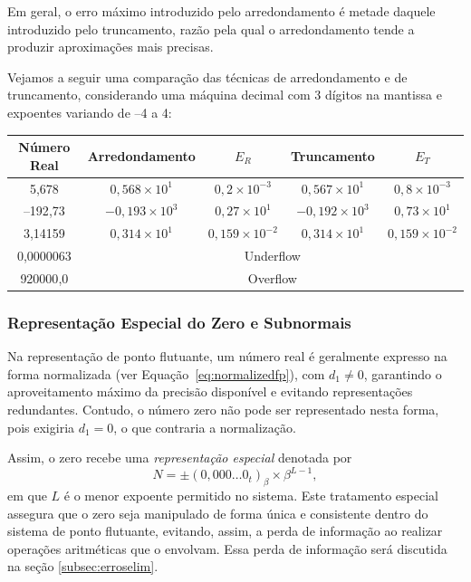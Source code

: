 Em geral, o erro máximo introduzido pelo arredondamento é metade daquele
introduzido pelo truncamento, razão pela qual o arredondamento tende a produzir
aproximações mais precisas.

Vejamos a seguir uma comparação das técnicas de arredondamento e de
truncamento, considerando uma máquina decimal com 3 dígitos na mantissa e
expoentes variando de –4 a 4:
\begin{center}
  \small
  \begin{tabular}{|c|c|c|c|c|}
    \hline
    \textbf{Número Real} & \textbf{Arredondamento}        & \textbf{\(E_R\)}             & \textbf{Truncamento}       & \textbf{\(E_T\)}             \\
    \hline
    5{,}678              & \( 0{,}568 \times 10^1 \)      & \( 0{,}2 \times 10^{-3} \)   & \( 0{,}567 \times 10^1 \)  & \( 0{,}8 \times 10^{-3} \)   \\
    \hline
    –192{,}73            & \( -0{,}193 \times 10^3 \)     & \( 0{,}27 \times 10^{1} \)   & \( -0{,}192 \times 10^3 \) & \( 0{,}73 \times 10^{1} \)   \\
    \hline
    3{,}14159            & \( 0{,}314 \times 10^1 \)      & \( 0{,}159 \times 10^{-2} \) & \( 0{,}314 \times 10^1 \)  & \( 0{,}159 \times 10^{-2} \) \\
    \hline
    0{,}0000063          & \multicolumn{4}{c|}{Underflow}                                                                                            \\
    \hline
    920000{,}0           & \multicolumn{4}{c|}{Overflow}                                                                                             \\
    \hline
  \end{tabular}
\end{center}

\subsubsection{Representação Especial do Zero e Subnormais}

Na representação de ponto flutuante, um número real é geralmente expresso na
forma normalizada (ver Equação~\ref{eq:normalizedfp}), com \( d_1 \neq 0 \),
garantindo o aproveitamento máximo da precisão disponível e evitando
representações redundantes. Contudo, o número zero não pode ser representado
nesta forma, pois exigiria \( d_1 = 0 \), o que contraria a normalização.

Assim, o zero recebe uma \textit{representação especial} denotada por
\begin{equation}
  N = \pm (0{,}000\ldots 0_{t})_\beta \times \beta^{L - 1},
\end{equation}
em que \( L \) é o menor expoente permitido no sistema. Este tratamento
especial assegura que o zero seja manipulado de forma única e consistente
dentro do sistema de ponto flutuante, evitando, assim, a perda de informação ao
realizar operações aritméticas que o envolvam. Essa perda de informação será
discutida na seção \ref{subsec:erroselim}.

